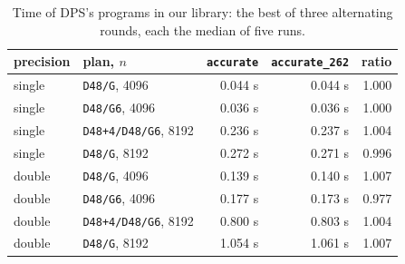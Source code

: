 \begin{table}[t]
\centering
\caption{Time of DPS's programs in our library: the best of three alternating rounds, each the median of five runs.}
\label{tab:speed}
\small
\begin{tabular}{llrrr}
\toprule
precision & plan, $n$ & \texttt{accurate} & \texttt{accurate\_262} & ratio\\
\midrule
single & \texttt{D48/G}, 4096 & 0.044 s & 0.044 s & 1.000\\
single & \texttt{D48/G6}, 4096 & 0.036 s & 0.036 s & 1.000\\
single & \texttt{D48+4/D48/G6}, 8192 & 0.236 s & 0.237 s & 1.004\\
single & \texttt{D48/G}, 8192 & 0.272 s & 0.271 s & 0.996\\
double & \texttt{D48/G}, 4096 & 0.139 s & 0.140 s & 1.007\\
double & \texttt{D48/G6}, 4096 & 0.177 s & 0.173 s & 0.977\\
double & \texttt{D48+4/D48/G6}, 8192 & 0.800 s & 0.803 s & 1.004\\
double & \texttt{D48/G}, 8192 & 1.054 s & 1.061 s & 1.007\\
\bottomrule
\end{tabular}
\end{table}


